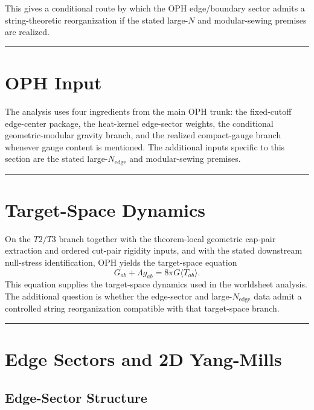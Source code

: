 This gives a conditional route by which the OPH edge/boundary sector admits a string-theoretic reorganization if the stated large-\(N\) and modular-sewing premises are realized.

\begin{center}\rule{0.5\linewidth}{0.5pt}\end{center}

\section{OPH Input}\label{2-oph-inputs-used}

The analysis uses four ingredients from the main OPH trunk: the fixed-cutoff edge-center package, the heat-kernel edge-sector weights, the conditional geometric-modular gravity branch, and the realized compact-gauge branch whenever gauge content is mentioned. The additional inputs specific to this section are the stated large-\(N_{\mathrm{edge}}\) and modular-sewing premises.

\begin{center}\rule{0.5\linewidth}{0.5pt}\end{center}

\section{Target-Space Dynamics}\label{3-einstein-equation-from-entanglement-equilibrium}

On the \(T2/T3\) branch together with the theorem-local geometric cap-pair extraction and ordered cut-pair rigidity inputs, and with the stated downstream null-stress identification, OPH yields the target-space equation
\[
\boxed{G_{ab} + \Lambda g_{ab} = 8\pi G \langle T_{ab} \rangle}.
\]
This equation supplies the target-space dynamics used in the worldsheet analysis. The additional question is whether the edge-sector and large-\(N_{\mathrm{edge}}\) data admit a controlled string reorganization compatible with that target-space branch.

\begin{center}\rule{0.5\linewidth}{0.5pt}\end{center}

\section{Edge Sectors and 2D Yang-Mills}\label{4-edge-sectors-and-2d-yang-mills}

\subsection{Edge-Sector Structure}\label{41-edge-sector-structure}

